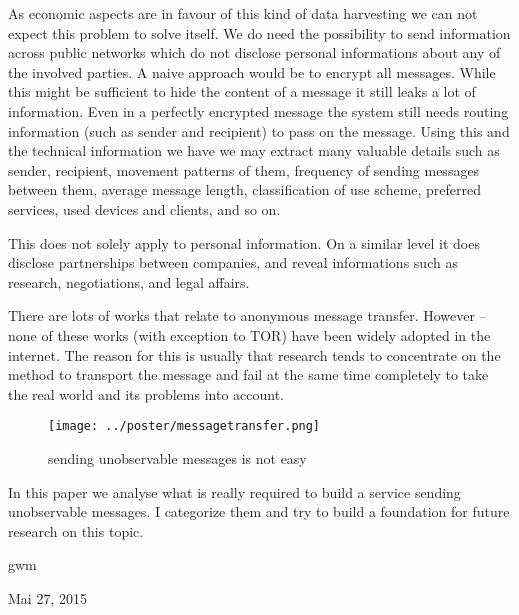 \documentclass[12pt,journal,compsoc]{IEEEtran}
\begin{document}
As economic aspects are in favour of this kind of data harvesting we can not expect this problem to solve itself. We do need the possibility to send information across public networks which do not disclose personal informations about any of the involved parties. A naive approach would be to encrypt all messages. While this might be sufficient to hide the content of a message it still leaks a lot of information. Even in a perfectly encrypted message the system still needs routing information (such as sender and recipient) to pass on the message. Using this and the technical information we have we may extract many valuable details such as sender, recipient, movement patterns of them, frequency of sending messages between them, average message length, classification of use scheme, preferred services, used devices and clients, and so on.\par
This does not solely apply to personal information. On a similar level it does disclose partnerships between companies, and reveal informations such as research, negotiations, and legal affairs.
\par
There are lots of works\cite{tor-design}\cite{mixmaster-spec}\cite{xor-trees}\cite{Levine:2002}\cite{chaum-mix} that relate to anonymous message transfer. However -- none of these works (with exception to TOR\cite{tor-design}) have been widely adopted in the internet. The reason for this is usually that research tends to concentrate on the method to transport the message and fail at the same time completely to take the real world and its problems into account. 

\begin{figure}
	\texttt{[image: ../poster/messagetransfer.png]}
	\caption{sending unobservable messages is not easy}
\end{figure}

In this paper we analyse what is really required to build a service sending unobservable messages. I categorize them and try to build a foundation for future research on this topic.
\par
\ifCLASSOPTIONpeerreview
\else
\hfill gwm
 
\hfill Mai 27, 2015
\fi
\end{document}
